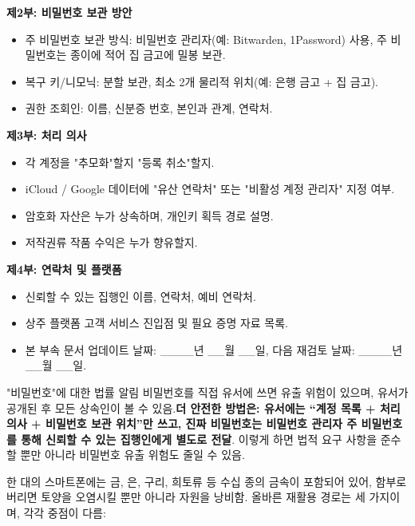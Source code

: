 \textbf{제2부: 비밀번호 보관 방안}

\begin{itemize}
  \item 주 비밀번호 보관 방식: 비밀번호 관리자(예: Bitwarden, 1Password) 사용, 주 비밀번호는 종이에 적어 집 금고에 밀봉 보관.
  \item 복구 키/니모닉: 분할 보관, 최소 2개 물리적 위치(예: 은행 금고 + 집 금고).
  \item 권한 조회인: 이름, 신분증 번호, 본인과 관계, 연락처.
\end{itemize}

\textbf{제3부: 처리 의사}

\begin{itemize}
  \item 각 계정을 "추모화"할지 "등록 취소"할지.
  \item iCloud / Google 데이터에 "유산 연락처" 또는 "비활성 계정 관리자" 지정 여부.
  \item 암호화 자산은 누가 상속하며, 개인키 획득 경로 설명.
  \item 저작권류 작품 수익은 누가 향유할지.
\end{itemize}

\textbf{제4부: 연락처 및 플랫폼}

\begin{itemize}
  \item 신뢰할 수 있는 집행인 이름, 연락처, 예비 연락처.
  \item 상주 플랫폼 고객 서비스 진입점 및 필요 증명 자료 목록.
  \item 본 부속 문서 업데이트 날짜: \_\_\_\_년 \_\_월 \_\_일, 다음 재검토 날짜: \_\_\_\_년 \_\_월 \_\_일.
\end{itemize}

\begin{tcbwarn}{"비밀번호"에 대한 법률 알림}
비밀번호를 직접 유서에 쓰면 유출 위험이 있으며, 유서가 공개된 후 모든 상속인이 볼 수 있음.\textbf{더 안전한 방법은: 유서에는 “계정 목록 + 처리 의사 + 비밀번호 보관 위치”만 쓰고, 진짜 비밀번호는 비밀번호 관리자 주 비밀번호를 통해 신뢰할 수 있는 집행인에게 별도로 전달}. 이렇게 하면 법적 요구 사항을 준수할 뿐만 아니라 비밀번호 유출 위험도 줄일 수 있음.

\end{tcbwarn}


한 대의 스마트폰에는 금, 은, 구리, 희토류 등 수십 종의 금속이 포함되어 있어, 함부로 버리면 토양을 오염시킬 뿐만 아니라 자원을 낭비함. 올바른 재활용 경로는 세 가지이며, 각각 중점이 다름:

